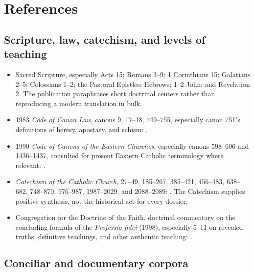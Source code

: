 \section{References}

\begingroup
\footnotesize
\setlength{\parskip}{0.25em}

\subsection{Scripture, law, catechism, and levels of teaching}

\begin{itemize}
  \item Sacred Scripture, especially Acts 15; Romans 3--9; 1 Corinthians 15; Galatians 2--5; Colossians 1--2; the Pastoral Epistles; Hebrews; 1--2 John; and Revelation 2. The publication paraphrases short doctrinal centers rather than reproducing a modern translation in bulk.
  \item 1983 \emph{Code of Canon Law}, canons 9, 17--18, 749--755, especially canon 751's definitions of heresy, apostasy, and schism: .
  \item 1990 \emph{Code of Canons of the Eastern Churches}, especially canons 598--606 and 1436--1437, consulted for present Eastern Catholic terminology where relevant: .
  \item \emph{Catechism of the Catholic Church}, 27--49, 185--267, 385--421, 456--483, 638--682, 748--870, 976--987, 1987--2029, and 2088--2089: . The Catechism supplies positive synthesis, not the historical act for every dossier.
  \item Congregation for the Doctrine of the Faith, doctrinal commentary on the concluding formula of the \emph{Professio fidei} (1998), especially 5--11 on revealed truths, definitive teachings, and other authentic teaching: .
\end{itemize}

\subsection{Conciliar and documentary corpora}

